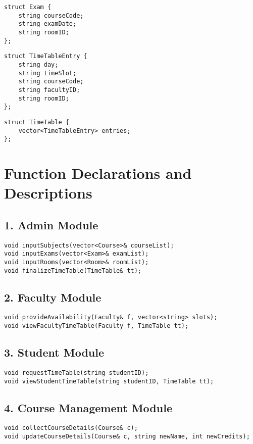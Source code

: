 \documentclass[12pt]{article}
\begin{document}
\begin{lstlisting}[style=cppstyle, caption=Exam Information]
struct Exam {
    string courseCode;
    string examDate;
    string roomID;
};
\end{lstlisting}

\begin{lstlisting}[style=cppstyle, caption=Timetable Entry]
struct TimeTableEntry {
    string day;
    string timeSlot;
    string courseCode;
    string facultyID;
    string roomID;
};
\end{lstlisting}

\begin{lstlisting}[style=cppstyle, caption=Timetable]
struct TimeTable {
    vector<TimeTableEntry> entries;
};
\end{lstlisting}

\section*{Function Declarations and Descriptions}

\subsection*{1. Admin Module}
\begin{lstlisting}[style=cppstyle]
void inputSubjects(vector<Course>& courseList);
void inputExams(vector<Exam>& examList);
void inputRooms(vector<Room>& roomList);
void finalizeTimeTable(TimeTable& tt);
\end{lstlisting}

\subsection*{2. Faculty Module}
\begin{lstlisting}[style=cppstyle]
void provideAvailability(Faculty& f, vector<string> slots);
void viewFacultyTimeTable(Faculty f, TimeTable tt);
\end{lstlisting}

\subsection*{3. Student Module}
\begin{lstlisting}[style=cppstyle]
void requestTimeTable(string studentID);
void viewStudentTimeTable(string studentID, TimeTable tt);
\end{lstlisting}

\subsection*{4. Course Management Module}
\begin{lstlisting}[style=cppstyle]
void collectCourseDetails(Course& c);
void updateCourseDetails(Course& c, string newName, int newCredits);
\end{lstlisting}
\end{document}
